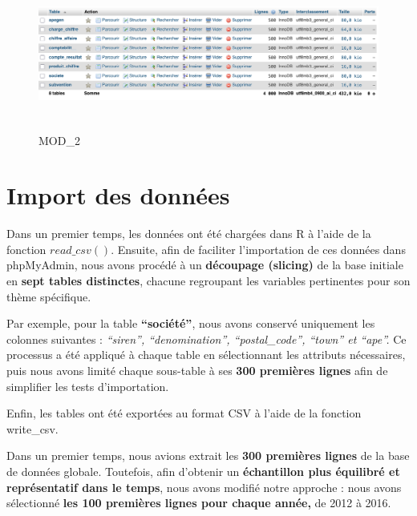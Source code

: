 \documentclass[mstat,12pt]{unswthesis}
\begin{document}
\begin{figure}
\centering
\includegraphics[width=15cm,height=5cm]{MCD_V01.png}
\caption{MOD\_2}\label{MOD}
\end{figure}

\bigskip

\section{Import des données}\label{import-des-donnuxe9es}

\bigskip

Dans un premier temps, les données ont été chargées dans R à l'aide de
la fonction \(read\_csv()\). Ensuite, afin de faciliter l'importation de
ces données dans phpMyAdmin, nous avons procédé à un \textbf{découpage
(slicing)} de la base initiale en \textbf{sept tables distinctes},
chacune regroupant les variables pertinentes pour son thème spécifique.

\medskip

Par exemple, pour la table \textbf{``société''}, nous avons conservé
uniquement les colonnes suivantes : \emph{``siren'', ``denomination'',
``postal\_code'', ``town'' et ``ape''.} Ce processus a été appliqué à
chaque table en sélectionnant les attributs nécessaires, puis nous avons
limité chaque sous-table à ses \textbf{300 premières lignes} afin de
simplifier les tests d'importation.

\medskip

Enfin, les tables ont été exportées au format CSV à l'aide de la
fonction write\_csv.

\medskip

Dans un premier temps, nous avions extrait les \textbf{300 premières
lignes} de la base de données globale. Toutefois, afin d'obtenir un
\textbf{échantillon plus équilibré et représentatif dans le temps}, nous
avons modifié notre approche : nous avons sélectionné \textbf{les 100
premières lignes pour chaque année,} de 2012 à 2016.

\medskip
\end{document}
